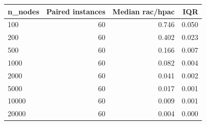 \begin{tabular}{lrrr}
\toprule
n\_nodes & Paired instances & Median rac/hpac & IQR \\
\midrule
100 & 60 & 0.746 & 0.050 \\
200 & 60 & 0.402 & 0.023 \\
500 & 60 & 0.166 & 0.007 \\
1000 & 60 & 0.082 & 0.004 \\
2000 & 60 & 0.041 & 0.002 \\
5000 & 60 & 0.017 & 0.001 \\
10000 & 60 & 0.009 & 0.001 \\
20000 & 60 & 0.004 & 0.000 \\
\bottomrule
\end{tabular}
